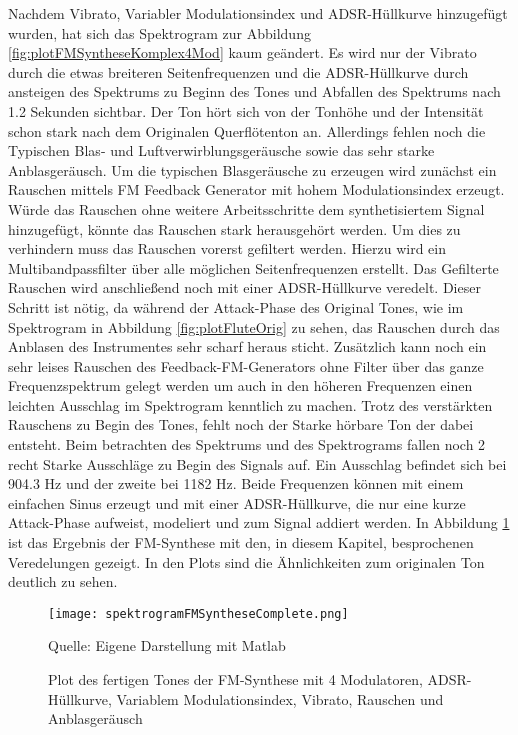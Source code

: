 Nachdem Vibrato, Variabler Modulationsindex und ADSR-Hüllkurve hinzugefügt wurden, hat sich das Spektrogram zur Abbildung \ref{fig:plotFMSyntheseKomplex4Mod} kaum geändert. Es wird nur der Vibrato durch die etwas breiteren Seitenfrequenzen und die ADSR-Hüllkurve durch ansteigen des Spektrums zu Beginn des Tones und Abfallen des Spektrums nach 1.2 Sekunden sichtbar. Der Ton hört sich von der Tonhöhe und der Intensität schon stark nach dem Originalen Querflötenton an. Allerdings fehlen noch die Typischen Blas- und Luftverwirblungsgeräusche sowie das sehr starke Anblasgeräusch. Um die typischen Blasgeräusche zu erzeugen wird zunächst ein Rauschen mittels FM Feedback Generator mit hohem Modulationsindex erzeugt. Würde das Rauschen ohne weitere Arbeitsschritte dem synthetisiertem Signal hinzugefügt, könnte das Rauschen stark herausgehört werden. Um dies zu verhindern muss das Rauschen vorerst gefiltert werden. Hierzu wird ein Multibandpassfilter über alle möglichen Seitenfrequenzen erstellt. Das Gefilterte Rauschen wird anschließend noch mit einer ADSR-Hüllkurve veredelt. Dieser Schritt ist nötig, da während der Attack-Phase des Original Tones, wie im Spektrogram in Abbildung \ref{fig:plotFluteOrig} zu sehen, das Rauschen durch das Anblasen des Instrumentes sehr scharf heraus sticht. Zusätzlich kann noch ein sehr leises Rauschen des Feedback-FM-Generators ohne Filter über das ganze Frequenzspektrum gelegt werden um auch in den höheren Frequenzen einen leichten Ausschlag im Spektrogram kenntlich zu machen. Trotz des verstärkten Rauschens zu Begin des Tones, fehlt noch der Starke hörbare Ton der dabei entsteht. Beim betrachten des Spektrums und des Spektrograms fallen noch 2 recht Starke Ausschläge zu Begin des Signals auf. Ein Ausschlag befindet sich bei 904.3 Hz und der zweite bei 1182 Hz. Beide Frequenzen können mit einem einfachen Sinus erzeugt und mit einer ADSR-Hüllkurve, die nur eine kurze Attack-Phase aufweist, modeliert und zum Signal addiert werden. In Abbildung \ref{fig:spektrogramFMSyntheseComplete} ist das Ergebnis der FM-Synthese mit den, in diesem Kapitel, besprochenen Veredelungen gezeigt. In den Plots sind die Ähnlichkeiten zum originalen Ton deutlich zu sehen.

\begin{figure} [h!t!b!]
\centering
  \texttt{[image: spektrogramFMSyntheseComplete.png]}
\caption{Plot des fertigen Tones der FM-Synthese mit 4 Modulatoren, ADSR-Hüllkurve, Variablem Modulationsindex, Vibrato, Rauschen und Anblasgeräusch}
\label{fig:spektrogramFMSyntheseComplete}
Quelle: Eigene Darstellung mit Matlab
\end{figure}

